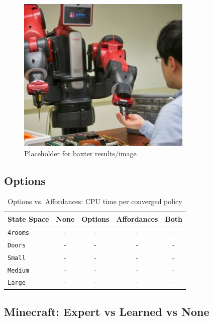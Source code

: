 \documentclass[conference]{IEEEtran}
\begin{document}
\begin{figure}[H]
\centering
\includegraphics[scale=0.195]{figures/baxter_temp.jpg}%
  \caption{Placeholder for baxter results/image}
  \label{fig:baxter_results}
\end{figure}

\subsection{Options}

\begin{table}[H]
\centering
\begin{tabular}{ l || c c c c }
  State Space 		& None & Options & Affordances & Both 	 	\\ \hline
  \texttt{4rooms}  	& 	-		&	-	&	-	&	-	\\
  \texttt{Doors}  		& 	-		&	-	&	-	&	-	\\
  \texttt{Small}  		& 	-		&	-	&	-	&	-	\\
  \texttt{Medium}  	& 	-		&	-	&	-	&	-	\\
  \texttt{Large}  		& 	-		&	-	&	-	&	-	\\
\end{tabular}
\caption{Options vs. Affordances: CPU time per converged policy}
\label{table:minecraft_results_cpu}
\end{table}

\subsection{Minecraft: Expert vs Learned vs None}
\end{document}
